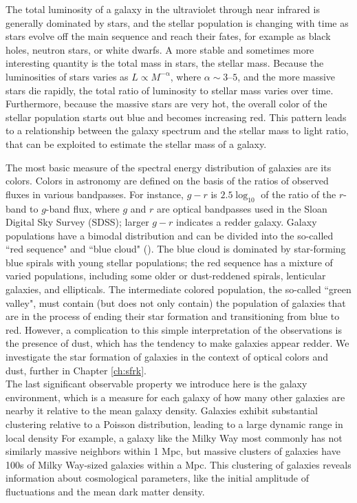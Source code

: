The total luminosity of a galaxy in the ultraviolet through near
infrared is generally dominated by stars, and the stellar population
is changing with time as stars evolve off the main sequence and reach
their fates, for example as black holes, neutron stars, or white
dwarfs.  A more stable and sometimes more interesting quantity is the
total mass in stars, the stellar mass. Because the luminosities of
stars varies as $L\propto M^{-{\mathrm\alpha}}$, where $\alpha \sim 3$--$5$,
and the more massive stars die rapidly, the total ratio of luminosity
to stellar mass varies over time. Furthermore, because the massive
stars are very hot, the overall color of the stellar population starts
out blue and becomes increasing red. This pattern leads to a
relationship between the galaxy spectrum and the stellar mass to light
ratio, that can be exploited to estimate the stellar mass of a galaxy.

The most basic measure of the spectral energy distribution of galaxies
are its colors.  Colors in astronomy are defined on the basis of the
ratios of observed fluxes in various bandpasses. For instance, $g-r$
is $2.5\log_{10}$ of the ratio of the $r$-band to $g$-band flux, where
$g$ and $r$ are optical bandpasses used in the Sloan Digital Sky
Survey (SDSS); larger $g-r$ indicates a redder galaxy.  Galaxy
populations have a bimodal distribution and can be divided into the
so-called ``red sequence" and ``blue cloud"
(\citet{2001AJ....122.1861S, 2003ApJ...594..186B}). The blue cloud is
dominated by star-forming blue spirals with young stellar populations;
the red sequence has a mixture of varied populations, including some
older or dust-reddened spirals, lenticular galaxies, and ellipticals.
The intermediate colored population, the so-called ``green valley",
must contain (but does not only contain) the population of galaxies
that are in the process of ending their star formation and
transitioning from blue to red. However, a complication to this simple
interpretation of the observations is the presence of dust, which has
the tendency to make galaxies appear redder. We investigate the star
formation of galaxies in the context of optical colors and dust,
further in Chapter \ref{ch:sfrk}.\\

The last significant observable property we introduce here is the
galaxy environment, which is a measure for each galaxy of how many
other galaxies are nearby it relative to the mean galaxy density.
Galaxies exhibit substantial clustering relative to a Poisson
distribution, leading to a large dynamic range in local density For
example, a galaxy like the Milky Way most commonly has not similarly
massive neighbors within 1 Mpc, but massive clusters of galaxies have
100s of Milky Way-sized galaxies within a Mpc. This clustering of
galaxies reveals information about cosmological parameters, like the
initial amplitude of fluctuations and the mean dark matter density.

